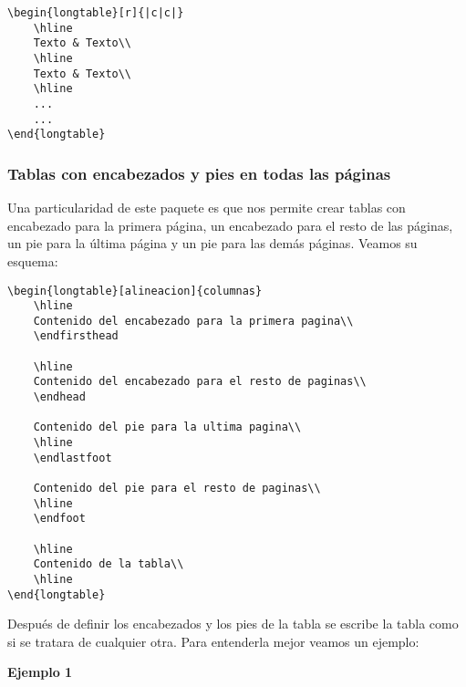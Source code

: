 	
	\begin{myquote}
		\begin{lstlisting}
\begin{longtable}[r]{|c|c|}		
	\hline
	Texto & Texto\\
	\hline
	Texto & Texto\\
	\hline
	...
	...
\end{longtable}			
		\end{lstlisting}		
	\end{myquote}
	
	
	\subsubsection{Tablas con encabezados y pies en todas las páginas}
	
	Una particularidad de este paquete es que nos permite crear tablas con encabezado para la primera página, un encabezado para el resto de las páginas, un pie para la última página y un pie para las demás páginas. Veamos su esquema:
	
	\begin{myquote}
		\begin{lstlisting}
\begin{longtable}[alineacion]{columnas}
	\hline 
	Contenido del encabezado para la primera pagina\\
	\endfirsthead
	
	\hline
	Contenido del encabezado para el resto de paginas\\
	\endhead
	
	Contenido del pie para la ultima pagina\\
	\hline
	\endlastfoot
	
	Contenido del pie para el resto de paginas\\
	\hline
	\endfoot
	
	\hline
	Contenido de la tabla\\
	\hline
\end{longtable}			
		\end{lstlisting}		
	\end{myquote}
	
	
	Después de definir los encabezados y los pies de la tabla se escribe la tabla como si se tratara de cualquier otra. Para entenderla mejor veamos un ejemplo:
	
	\textbf{Ejemplo 1}
	
